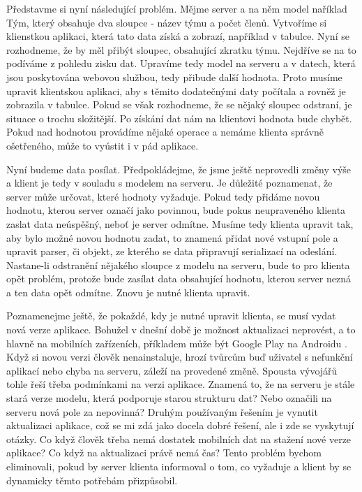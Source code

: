 Představme si nyní následující problém. Mějme server a na něm model naříklad Tým, který obsahuje dva sloupce - název týmu a počet členů. Vytvoříme si klienstkou aplikaci, která tato data získá a zobrazí, například v tabulce. Nyní se rozhodneme, že by měl přibýt sloupec, obsahující zkratku týmu. Nejdříve se na to podíváme z pohledu zisku dat. Upravíme tedy model na serveru a v datech, která jsou poskytována webovou službou, tedy přibude další hodnota. Proto musíme upravit klientskou aplikaci, aby s těmito dodatečnými daty počítala a rovněž je zobrazila v tabulce. Pokud se však rozhodneme, že se nějaký sloupec odstraní, je situace o trochu složitější. Po získání dat nám na klientovi hodnota bude chybět. Pokud nad hodnotou provádíme nějaké operace a nemáme klienta správně ošetřeného, může to vyústit i v pád aplikace.

Nyní budeme data posílat. Předpokládejme, že jsme ještě neprovedli změny výše a klient je tedy v souladu s modelem na serveru. Je důležité poznamenat, že server může určovat, které hodnoty vyžaduje. Pokud tedy přidáme novou hodnotu, kterou server označí jako povinnou, bude pokus neupraveného klienta zaslat data neúspěšný, neboť je server odmítne. Musíme tedy klienta upravit tak, aby bylo možné novou hodnotu zadat, to znamená přidat nové vstupní pole a upravit parser, či objekt, ze kterého se data připravují serializací na odeslání. Nastane-li odstranění nějakého sloupce z modelu na serveru, bude to pro klienta opět problém, protože bude zasílat data obsahující hodnotu, kterou server nezná a ten data opět odmítne. Znovu je nutné klienta upravit. 

Poznamenejme ještě, že pokaždé, kdy je nutné upravit klienta, se musí vydat nová verze aplikace. Bohužel v dnešní době je možnost aktualizaci neprovést, a to hlavně na mobilních zařízeních, příkladem může být Google Play na Androidu \cite{android-auto-update}. Když si novou verzi člověk nenainstaluje, hrozí tvůrcům buď uživatel s nefunkční aplikací nebo chyba na serveru, záleží na provedené změně. Spousta vývojářů tohle řeší třeba podmínkami na verzi aplikace. Znamená to, že na serveru je stále stará verze modelu, která podporuje starou strukturu dat? Nebo označili na serveru nová pole za nepovinná? Druhým používaným řešením je vynutit aktualizaci aplikace, což se mi zdá jako docela dobré řešení, ale i zde se vyskytují otázky. Co když člověk třeba nemá dostatek mobilních dat na stažení nové verze aplikace? Co když na aktualizaci právě nemá čas? Tento problém bychom eliminovali, pokud by server klienta informoval o tom, co vyžaduje a klient by se dynamicky těmto potřebám přizpůsobil.

